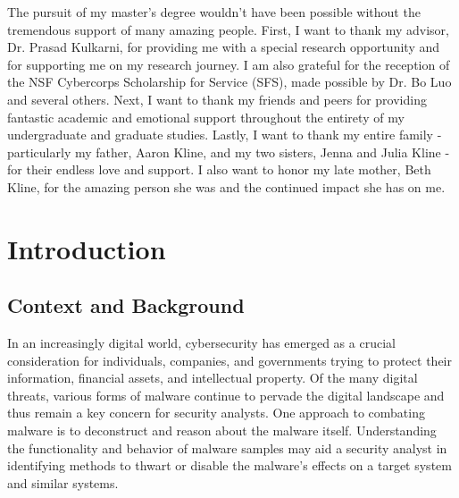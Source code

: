 \begin{romanpages}
\begin{abstract}
    \end{abstract}
    \begin{acknowledgements}

The pursuit of my master's degree wouldn't have been possible without the tremendous support of many amazing people. First, I want to thank my advisor, Dr. Prasad Kulkarni, for providing me with a special research opportunity and for supporting me on my research journey. I am also grateful for the reception of the NSF Cybercorps Scholarship for Service (SFS), made possible by Dr. Bo Luo and several others. Next, I want to thank my friends and peers for providing fantastic academic and emotional support throughout the entirety of my undergraduate and graduate studies. Lastly, I want to thank my entire family - particularly my father, Aaron Kline, and my two sisters, Jenna and Julia Kline - for their endless love and support. I also want to honor my late mother, Beth Kline, for the amazing person she was and the continued impact she has on me.
                
    \end{acknowledgements}
    \tableofcontents{}
    \listoffigures
    \listoftables
\end{romanpages}

\chapter{Introduction} \label{sec:introduction}

\section{Context and Background}

In an increasingly digital world, cybersecurity has emerged as a crucial consideration for individuals, companies, and governments trying to protect their information, financial assets, and intellectual property. Of the many digital threats, various forms of malware continue to pervade the digital landscape and thus remain a key concern for security analysts. One approach to combating malware is to deconstruct and reason about the malware itself. Understanding the functionality and behavior of malware samples may aid a security analyst in identifying methods to thwart or disable the malware's effects on a target system and similar systems.

